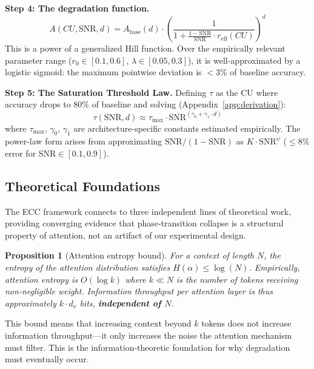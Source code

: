 \documentclass{article}
\newtheorem{proposition}{Proposition}
\begin{document}
\textbf{Step 4: The degradation function.}
\begin{equation}
A(CU, \mathrm{SNR}, d) = A_{\text{base}}(d) \cdot \left(\frac{1}{1 + \frac{1-\mathrm{SNR}}{\mathrm{SNR}} \cdot r_{\text{eff}}(CU)}\right)^d
\label{eq:degradation}
\end{equation}
This is a power of a generalized Hill function. Over the empirically relevant parameter range ($r_0 \in [0.1, 0.6]$, $\lambda \in [0.05, 0.3]$), it is well-approximated by a logistic sigmoid: the maximum pointwise deviation is ${<}3\%$ of baseline accuracy.

\textbf{Step 5: The Saturation Threshold Law.}
Defining $\tau$ as the CU where accuracy drops to 80\% of baseline and solving (Appendix~\ref{app:derivation}):
\begin{equation}
\boxed{\tau(\mathrm{SNR}, d) \approx \tau_{\max} \cdot \mathrm{SNR}^{(\gamma_0 + \gamma_1 \cdot d)}}
\label{eq:threshold_law}
\end{equation}
where $\tau_{\max}$, $\gamma_0$, $\gamma_1$ are architecture-specific constants estimated empirically. The power-law form arises from approximating $\mathrm{SNR}/(1{-}\mathrm{SNR})$ as $K \cdot \mathrm{SNR}^\psi$ ($\leq 8\%$ error for $\mathrm{SNR} \in [0.1, 0.9]$).

\subsection{Theoretical Foundations}
\label{sec:theoretical_foundations}

The ECC framework connects to three independent lines of theoretical work, providing converging evidence that phase-transition collapse is a structural property of attention, not an artifact of our experimental design.

\begin{proposition}[Attention entropy bound]
For a context of length $N$, the entropy of the attention distribution satisfies $H(\alpha) \leq \log(N)$. Empirically, attention entropy is $O(\log k)$ where $k \ll N$ is the number of tokens receiving non-negligible weight. Information throughput per attention layer is thus approximately $k \cdot d_v$ bits, \textbf{independent of $N$}.
\end{proposition}

This bound means that increasing context beyond $k$ tokens does not increase information throughput---it only increases the noise the attention mechanism must filter. This is the information-theoretic foundation for why degradation must eventually occur.
\end{document}
